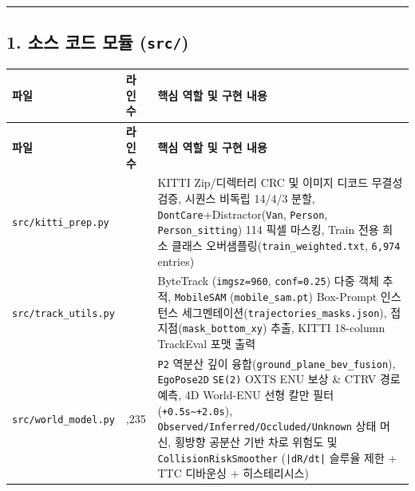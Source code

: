 \documentclass[10.5pt,a4paper]{article}
\begin{document}
\par\noindent\rule{\textwidth}{0.4pt}\par\medskip

\subsection{1. 소스 코드 모듈 (\texttt{src/\allowbreak{}})}


\begin{footnotesize}
\setlength{\tabcolsep}{4pt}
\setlength{\LTleft}{0pt}\setlength{\LTright}{0pt}
\begin{longtable}{>{\raggedright\arraybackslash}p{} >{\raggedright\arraybackslash}p{} >{\raggedright\arraybackslash}p{}}
\toprule
\textbf{파일} & \textbf{라인 수} & \textbf{핵심 역할 및 구현 내용} \\
\midrule
\endfirsthead
\toprule
\textbf{파일} & \textbf{라인 수} & \textbf{핵심 역할 및 구현 내용} \\
\midrule
\endhead
\bottomrule
\endfoot
\texttt{src/\allowbreak{}kitti\_\allowbreak{}prep.\allowbreak{}py} & 624 & KITTI Zip/디렉터리 CRC 및 이미지 디코드 무결성 검증, 시퀀스 비독립 14/4/3 분할, \texttt{DontCare}+Distractor(\texttt{Van}, \texttt{Person}, \texttt{Person\_\allowbreak{}sitting}) 114 픽셀 마스킹, Train 전용 희소 클래스 오버샘플링(\texttt{train\_\allowbreak{}weighted.\allowbreak{}txt}, \texttt{6,\allowbreak{}974} entries) \\
\texttt{src/\allowbreak{}track\_\allowbreak{}utils.\allowbreak{}py} & 620 & ByteTrack (\texttt{imgsz=960}, \texttt{conf=0.\allowbreak{}25}) 다중 객체 추적, \texttt{MobileSAM} (\texttt{mobile\_\allowbreak{}sam.\allowbreak{}pt}) Box-Prompt 인스턴스 세그멘테이션(\texttt{trajectories\_\allowbreak{}masks.\allowbreak{}json}), 접지점(\texttt{mask\_\allowbreak{}bottom\_\allowbreak{}xy}) 추출, KITTI 18-column TrackEval 포맷 출력 \\
\texttt{src/\allowbreak{}world\_\allowbreak{}model.\allowbreak{}py} & 1,235 & \texttt{P2} 역분산 깊이 융합(\texttt{ground\_\allowbreak{}plane\_\allowbreak{}bev\_\allowbreak{}fusion}), \texttt{EgoPose2D} \texttt{SE(2)} OXTS ENU 보상 \& CTRV 경로 예측, 4D World-ENU 선형 칼만 필터(\texttt{+0.\allowbreak{}5s\textasciitilde{}+2.\allowbreak{}0s}), \texttt{Observed/\allowbreak{}Inferred/\allowbreak{}Occluded/\allowbreak{}Unknown} 상태 머신, 횡방향 공분산 기반 차로 위험도 및 \texttt{CollisionRiskSmoother} (\texttt{|dR/\allowbreak{}dt|} 슬루율 제한 + TTC 디바운싱 + 히스테리시스) \\

\end{longtable}
\end{footnotesize}
\end{document}
